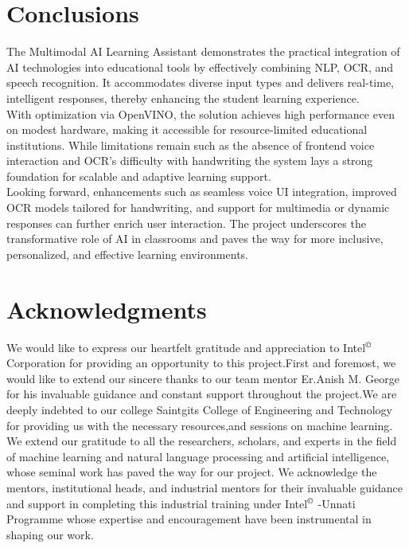 \documentclass{josis}
\begin{document}
\newpage
\section{Conclusions}
The Multimodal AI Learning Assistant demonstrates the practical integration of AI technologies into educational tools by effectively combining NLP, OCR, and speech recognition. It accommodates diverse input types and delivers real-time, intelligent responses, thereby enhancing the student learning experience.\\
With optimization via OpenVINO, the solution achieves high performance even on modest hardware, making it accessible for resource-limited educational institutions. While limitations remain such as the absence of frontend voice interaction and OCR's difficulty with handwriting the system lays a strong foundation for scalable and adaptive learning support.\\
Looking forward, enhancements such as seamless voice UI integration, improved OCR models tailored for handwriting, and support for multimedia or dynamic responses can further enrich user interaction. The project underscores the transformative role of AI in classrooms and paves the way for more inclusive, personalized, and effective learning environments.

\section*{Acknowledgments}
We would like to express our heartfelt gratitude and appreciation to Intel$^\copyright$ Corporation for providing an opportunity to this project.First and foremost, we would like to extend our sincere thanks to our team mentor Er.Anish M. George for his invaluable guidance and constant support throughout the project.We are deeply indebted to our college Saintgits College of Engineering and Technology for providing us with the necessary resources,and sessions on machine learning. We extend our gratitude to all the researchers, scholars, and experts in the field of machine learning and natural language processing and artificial intelligence, whose seminal work has paved the way for our project. We acknowledge the mentors, institutional heads, and industrial mentors for their invaluable guidance and support in completing this industrial training under Intel$^\copyright$ -Unnati Programme whose expertise and encouragement have been instrumental in shaping our work.
\end{document}
